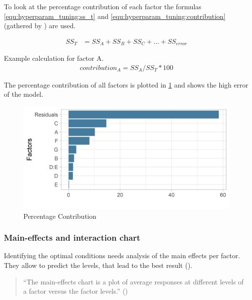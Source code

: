 To look at the percentage contribution of each factor the formulas \ref{equ:hyperparam_tuning:ss_t} and \ref{equ:hyperparam_tuning:contribution} (gathered by \cite{yang_design_2009}) are used.

\begin{equation} \label{equ:hyperparam_tuning:ss_t}
	\begin{split}
		SS_T & = SS_A + SS_B + SS_C + ... + SS_{error}
	\end{split}
\end{equation}

Example calculation for factor A.
\begin{equation} \label{equ:hyperparam_tuning:contribution}
	\begin{split}
		contribution_A = SS_A / SS_T * 100
	\end{split}
\end{equation}

The percentage contribution of all factors is plotted in \ref{fig:hyperparam_tuning:percentage_contribution} and shows the high error of the model. 
\begin{figure}[ht] 
	\label{fig:hyperparam_tuning:percentage_contribution}
	\includegraphics[width=1\linewidth]{simulations/taguchi/plots/percentage_contribution}
	\caption{Percentage Contribution}
\end{figure}


\subsubsection{Main-effects and interaction chart}
Identifying the optimal conditions needs analysis of the main effects per factor. They allow to predict the levels, that lead to the best result (\cite{roy_primer_1990}).

\begin{quote}
	\begin{em}
		\enquote{The main-effects chart is a plot of average responses at different levels of a factor versus the factor levels.} (\cite{yang_design_2009})
	\end{em}
\end{quote}

